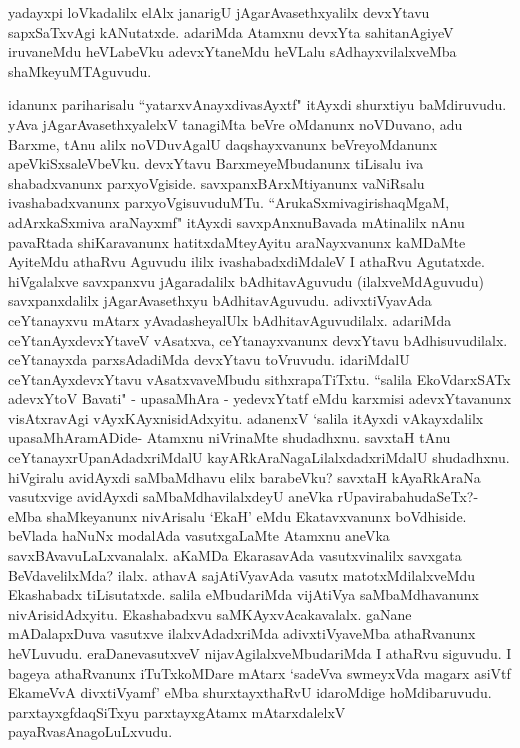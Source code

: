 
\begin{artha}
yadayxpi loVkadalilx elAlx janarigU jAgarAvasethxyalilx devxYtavu sapxSaTxvAgi kANutatxde. adariMda Atamxnu devxYta sahitanAgiyeV iruvaneMdu heVLabeVku adevxYtaneMdu heVLalu sAdhayxvilalxveMba shaMkeyuMTAguvudu.
\end{artha}

\begin{artha}
idanunx pariharisalu ``yatarxvAnayxdivasAyxtf" itAyxdi shurxtiyu baMdiruvudu. yAva jAgarAvasethxyalelxV tanagiMta beVre oMdanunx noVDuvano, adu Barxme, tAnu alilx noVDuvAgalU daqshayxvanunx beVreyoMdanunx apeVkiSxsaleVbeVku. devxYtavu BarxmeyeMbudanunx tiLisalu iva shabadxvanunx parxyoVgiside. savxpanxBArxMtiyanunx vaNiRsalu ivashabadxvanunx parxyoVgisuvuduMTu. ``ArukaSxmivagirishaqMgaM, adArxkaSxmiva araNayxmf" itAyxdi savxpAnxnuBavada mAtinalilx nAnu pavaRtada shiKaravanunx hatitxdaMteyAyitu araNayxvanunx kaMDaMte AyiteMdu athaRvu Aguvudu ililx ivashabadxdiMdaleV I athaRvu Agutatxde. hiVgalalxve savxpanxvu jAgaradalilx bAdhitavAguvudu (ilalxveMdAguvudu) savxpanxdalilx jAgarAvasethxyu bAdhitavAguvudu. adivxtiVyavAda ceYtanayxvu mAtarx yAvadasheyalUlx bAdhitavAguvudilalx. adariMda ceYtanAyxdevxYtaveV vAsatxva, ceYtanayxvanunx devxYtavu bAdhisuvudilalx. ceYtanayxda parxsAdadiMda devxYtavu toVruvudu. idariMdalU ceYtanAyxdevxYtavu vAsatxvaveMbudu sithxrapaTiTxtu. ``salila EkoVdarxSATx adevxYtoV Bavati" - upasaMhAra - yedevxYtatf  eMdu karxmisi adevxYtavanunx visAtxravAgi vAyxKAyxnisidAdxyitu. adanenxV `salila itAyxdi vAkayxdalilx upasaMhAramADide- Atamxnu niVrinaMte shudadhxnu. savxtaH tAnu ceYtanayxrUpanAdadxriMdalU kayARkAraNagaLilalxdadxriMdalU shudadhxnu. hiVgiralu avidAyxdi saMbaMdhavu elilx barabeVku? savxtaH kAyaRkAraNa vasutxvige avidAyxdi saMbaMdhavilalxdeyU aneVka rUpavirabahudaSeTx?- eMba shaMkeyanunx nivArisalu `EkaH' eMdu Ekatavxvanunx boVdhiside. beVlada haNuNx modalAda vasutxgaLaMte Atamxnu aneVka savxBAvavuLaLxvanalalx. aKaMDa EkarasavAda vasutxvinalilx savxgata BeVdavelilxMda? ilalx. athavA sajAtiVyavAda vasutx matotxMdilalxveMdu Ekashabadx tiLisutatxde. salila eMbudariMda vijAtiVya saMbaMdhavanunx nivArisidAdxyitu. Ekashabadxvu saMKAyxvAcakavalalx. gaNane mADalapxDuva vasutxve ilalxvAdadxriMda adivxtiVyaveMba athaRvanunx heVLuvudu. eraDanevasutxveV nijavAgilalxveMbudariMda I athaRvu siguvudu. I bageya athaRvanunx iTuTxkoMDare mAtarx `sadeVva swmeyxVda magarx asiVtf EkameVvA divxtiVyamf' eMba shurxtayxthaRvU idaroMdige hoMdibaruvudu. parxtayxgfdaqSiTxyu parxtayxgAtamx mAtarxdalelxV payaRvasAnagoLuLxvudu.
\end{artha}%

